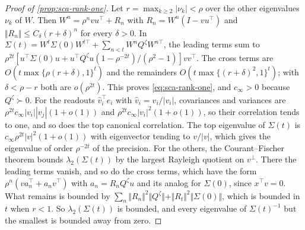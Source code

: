 \begin{proof}[Proof of \cref{prop:sca-rank-one}]
Let $r=\max_{k\ge2}|\nu_k|<\rho$ over the other eigenvalues $\nu_k$ of $W$. Then $W^n=\rho^nvu^\top+R_n$ with $R_n=W^n(I-vu^\top)$ and $\Vert R_n\Vert\le C_\delta(r+\delta)^n$ for every $\delta>0$. In $\Sigma(t)=W^t\Sigma(0)W^{t\top}+\sum_{n<t}W^nQ^\zeta W^{n\top}$, the leading terms sum to $\rho^{2t}[u^\top\Sigma(0)u+u^\top Q^\zeta u(1-\rho^{-2t})/(\rho^2-1)]vv^\top$. The cross terms are $O(t\max\{\rho(r+\delta),1\}^t)$ and the remainders $O(t\max\{(r+\delta)^2,1\}^t)$; with $\delta<\rho-r$ both are $o(\rho^{2t})$. This proves \eqref{eq:sca-rank-one}, and $c_\infty>0$ because $Q^\zeta\succ0$. For the readouts $\hat v_i^\top e_i$ with $\hat v_i=v_i/|v_i|$, covariances and variances are $\rho^{2t}c_\infty|v_i||v_j|(1+o(1))$ and $\rho^{2t}c_\infty|v_i|^2(1+o(1))$, so their correlation tends to one, and so does the top canonical correlation. The top eigenvalue of $\Sigma(t)$ is $c_\infty\rho^{2t}|v|^2(1+o(1))$ with eigenvector tending to $v/|v|$, which gives the eigenvalue of order $\rho^{-2t}$ of the precision. For the others, the Courant--Fischer theorem bounds $\lambda_2(\Sigma(t))$ by the largest Rayleigh quotient on $v^\perp$. There the leading terms vanish, and so do the cross terms, which have the form $\rho^n(va_n^\top+a_nv^\top)$ with $a_n=R_nQ^\zeta u$ and its analog for $\Sigma(0)$, since $x^\top v=0$. What remains is bounded by $\sum_n\Vert R_n\Vert^2\Vert Q^\zeta\Vert+\Vert R_t\Vert^2\Vert\Sigma(0)\Vert$, which is bounded in $t$ when $r<1$. So $\lambda_2(\Sigma(t))$ is bounded, and every eigenvalue of $\Sigma(t)^{-1}$ but the smallest is bounded away from zero.
\end{proof}

